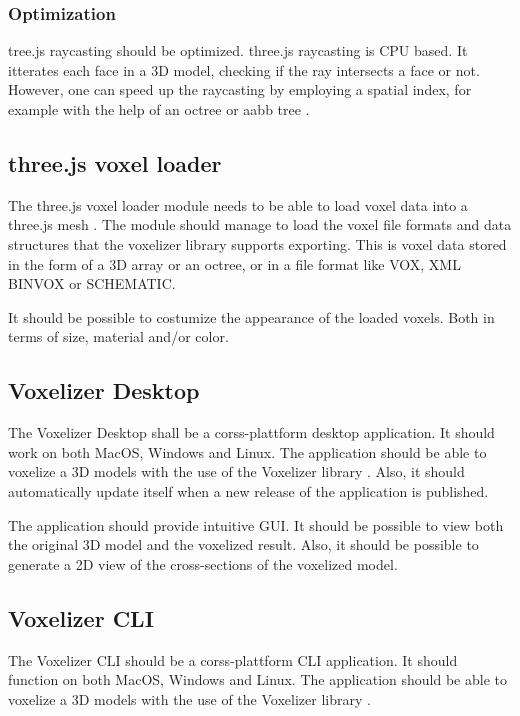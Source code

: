 \subsubsection{Optimization}
tree.js raycasting should be optimized. three.js raycasting is CPU based. It itterates each face in a 3D model, checking if the ray intersects a face or not. However, one can speed up the raycasting by employing a spatial index, for example with the help of an octree \cite{octree} or aabb tree .

\subsection{three.js voxel loader}
The three.js voxel loader module needs to be able to load voxel data into a three.js mesh \cite{three.js-mesh}. The module should manage to load the voxel file formats and data structures that the voxelizer library supports exporting. This is voxel data stored in the form of a 3D array or an octree, or in a file format like VOX, XML BINVOX or SCHEMATIC.

It should be possible to costumize the appearance of the loaded voxels. Both in terms of size, material and/or color.

\subsection{Voxelizer Desktop}
The Voxelizer Desktop shall be a corss-plattform \cite{cross-platform} desktop application. It should work on both MacOS, Windows and Linux. The application should be able to voxelize a 3D models with the use of the Voxelizer library \cite{voxelizer}. Also, it should automatically update itself when a new release of the application is published.

The application should provide intuitive GUI. It should be possible to view both the original 3D model and the voxelized result. Also, it should be possible to generate a 2D view of the cross-sections of the voxelized model.

\subsection{Voxelizer CLI}
The Voxelizer CLI should be a corss-plattform \cite{cross-platform} CLI application. It should function on both MacOS, Windows and Linux. The application should be able to voxelize a 3D models with the use of the Voxelizer library \cite{voxelizer}.

